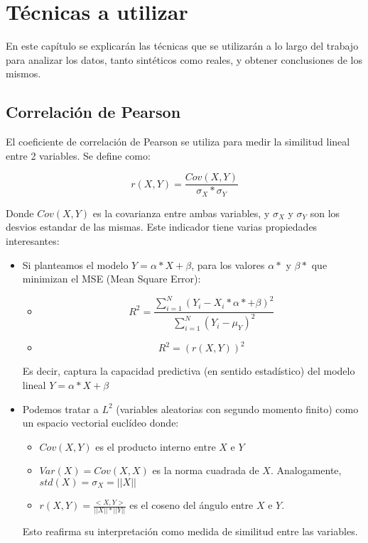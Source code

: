 \chapter{Técnicas a utilizar} \label{chapter:tecnicas_a_utilizar}

En este capítulo se explicarán las técnicas que se utilizarán a lo largo del trabajo para analizar los datos, tanto sintéticos como reales, y obtener conclusiones de los mismos.

\section{Correlación de Pearson}

El coeficiente de correlación de Pearson se utiliza para medir la similitud lineal entre 2 variables. Se define como:

$$
    r(X,Y) = \frac{Cov(X,Y)}{\sigma_X * \sigma_Y}
$$

Donde $Cov(X,Y)$ es la covarianza entre ambas variables, y $\sigma_X$ y $\sigma_Y$ son los desvios estandar de las mismas. Este indicador tiene varias propiedades interesantes:

\begin{itemize}
    \item Si planteamos el modelo $Y = \alpha * X + \beta$, para los valores $\alpha*$ y $\beta*$ que minimizan el MSE (Mean Square Error):
        \begin{itemize}
            \item $$ R^2 = \frac{\sum_{i=1}^{N} (Y_i - X_i * \alpha* + \beta)^2} {\sum_{i=1}^{N} (Y_i - \mu_Y)^2} $$
            \item $$ R^2 = (r(X,Y))^2 $$
        \end{itemize}

        Es decir, captura la capacidad predictiva (en sentido estadístico) del modelo lineal $Y = \alpha * X + \beta$
    \item Podemos tratar a $L^2$ (variables aleatorias con segundo momento finito) como un espacio vectorial euclídeo donde:
        \begin{itemize}
            \item $Cov(X,Y)$ es el producto interno entre $X$ e $Y$
            \item $Var(X) = Cov(X,X)$ es la norma cuadrada de $X$. Analogamente, $std(X) = \sigma_X = ||X||$
            \item $ r(X,Y) = \frac{<X,Y>}{||X|| * ||Y||} $ es el coseno del ángulo entre $X$ e $Y$.
        \end{itemize}

        Esto reafirma su interpretación como medida de similitud entre las variables.
\end{itemize}



